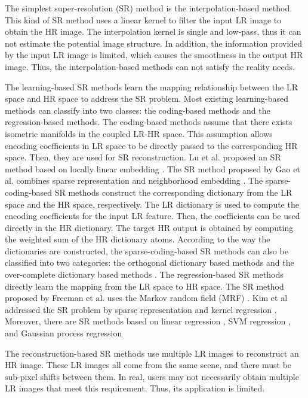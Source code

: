 \documentclass[review,numbers,sort&compress]{elsarticle}  %
\begin{document}
The simplest super-resolution (SR) method is the interpolation-based method. This kind of SR method uses a linear kernel to filter the input LR image to obtain the HR image. The interpolation kernel is single and low-pass, thus it can not estimate the potential image structure. In addition, the information provided by the input LR image is limited, which causes the smoothness in the output HR image. Thus, the interpolation-based methods can not satisfy the reality needs.

The learning-based SR methods learn the mapping relationship between the LR space and HR space to address the SR problem. Most existing learning-based methods can classify into two classes: the coding-based methods and the regression-based methods. The coding-based methods assume that there exists isometric manifolds in the coupled LR-HR space. This assumption allows encoding coefficients in LR space to be directly passed to the corresponding HR space. Then, they are used for SR reconstruction. Lu et al. proposed an SR method based on locally linear embedding \cite{chan2007superresolution}. The SR method proposed by Gao et al. combines sparse representation and neighborhood embedding \cite{lu2013image}. The sparse-coding-based SR methods construct the corresponding dictionary from the LR space and the HR space, respectively. The LR dictionary is used to compute the encoding coefficients for the input LR feature. Then, the coefficients can be used directly in the HR dictionary. The target HR output is obtained by computing the weighted sum of the HR dictionary atoms. According to the way the dictionaries are constructed, the sparse-coding-based SR methods can also be classified into two categories: the orthogonal dictionary based methods \cite{mallat2010super}\cite{dong2013sparse} and the over-complete dictionary based methods \cite{yang2010image} \cite{yang2012coupled}\cite{lu2014alternatively}\cite{wang2012semi}. The regression-based SR methods directly learn the mapping from the LR space to HR space. The SR method proposed by Freeman et al. uses the Markov random field (MRF) \cite{freeman2000learning}. Kim et al addressed the SR problem by sparse representation and kernel regression \cite{kim2010single}. Moreover, there are SR methods based on linear regression \cite{yang2013fast}\cite{zhang2015learning}, SVM regression \cite{ni2007image}, and Gaussian process regression \cite{wang2017single}\cite{he2011single}\cite{li2015learning}\cite{wang2016image}

The reconstruction-based SR methods \cite{IRANI1991231}\cite{1033210} \cite{lin2004fundamental}use multiple LR images to reconstruct an HR image. These LR images all come from the same scene, and there must be sub-pixel shifts between them. In real, users may not necessarily obtain multiple LR images that meet this requirement. Thus, its application is limited.
\end{document}
